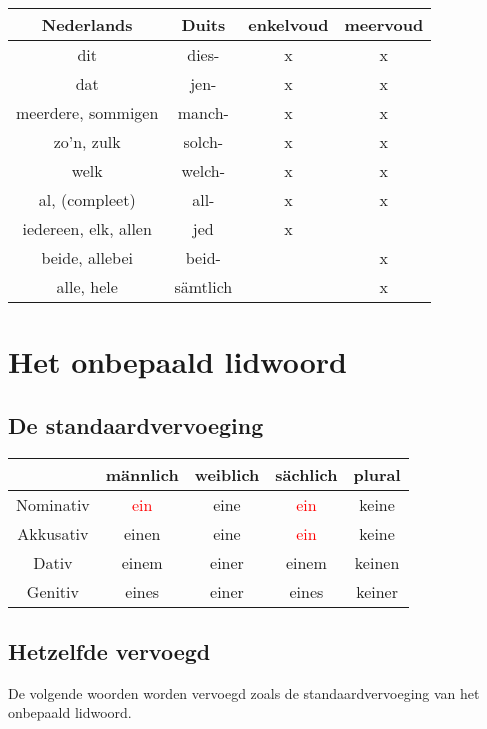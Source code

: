 \documentclass[main.tex]{subfiles}
\begin{document}
\begin{tabular}{|c|c|c|c|}
\hline 
\rowcolor{gray}
Nederlands & Duits & enkelvoud & meervoud \\ 
\hline 
dit & dies- & x & x \\ 
\hline 
dat & jen- & x & x \\ 
\hline 
meerdere, sommigen & manch- & x & x \\ 
\hline 
zo'n, zulk & solch- & x & x \\ 
\hline 
welk & welch- & x & x \\ 
\hline 
al, (compleet) & all- & x & x \\ 
\hline 
iedereen, elk, allen & jed & x &  \\ 
\hline 
beide, allebei & beid- &  & x \\ 
\hline 
alle, hele & sämtlich &  & x \\ 
\hline 
\end{tabular} 
\section{Het onbepaald lidwoord}
\subsection{De standaardvervoeging}

\begin{tabular}{|c|c|c|c|c|}
\hline 
\rowcolor{gray}
& männlich & weiblich & sächlich & plural \\ 
\hline 
\cellcolor[gray]{0.8}Nominativ & \textcolor{red}{ein} & eine & \textcolor{red}{ein} & keine \\ 
\hline 
\cellcolor[gray]{0.8}Akkusativ & einen & eine & \textcolor{red}{ein} & keine \\ 
\hline 
\cellcolor[gray]{0.8}Dativ & einem & einer & einem & keinen \\ 
\hline 
\cellcolor[gray]{0.8}Genitiv & eines & einer & eines & keiner \\ 
\hline 
\end{tabular} 

\subsection{Hetzelfde vervoegd}
De volgende woorden worden vervoegd zoals de standaardvervoeging van het onbepaald lidwoord.
\end{document}
